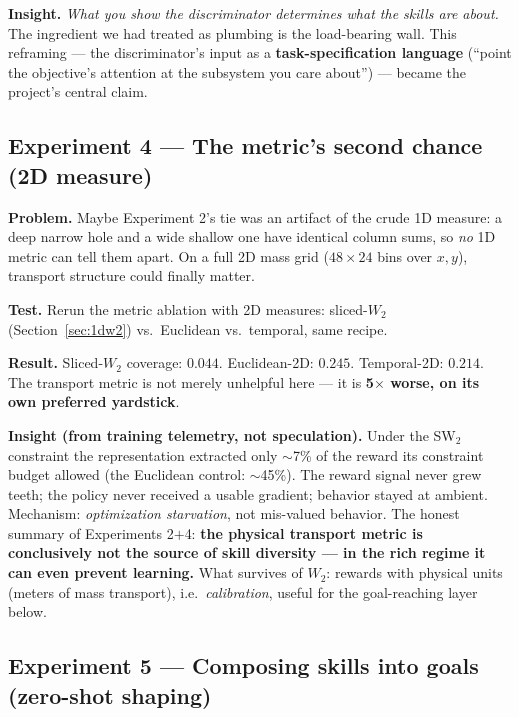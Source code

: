 \documentclass[11pt,a4paper]{article}
\begin{document}
\textbf{Insight.} \emph{What you show the discriminator determines what the
skills are about.} The ingredient we had treated as plumbing is the load-bearing
wall. This reframing --- the discriminator's input as a \textbf{task-specification
language} (``point the objective's attention at the subsystem you care about'') ---
became the project's central claim.

\subsection{Experiment 4 — The metric's second chance (2D measure)}

\textbf{Problem.} Maybe Experiment 2's tie was an artifact of the crude 1D
measure: a deep narrow hole and a wide shallow one have identical column sums,
so \emph{no} 1D metric can tell them apart. On a full 2D mass grid
($48 \times 24$ bins over $x,y$), transport structure could finally matter.

\textbf{Test.} Rerun the metric ablation with 2D measures: sliced-$W_2$
(Section~\ref{sec:1dw2}) vs.\ Euclidean vs.\ temporal, same recipe.

\textbf{Result.} Sliced-$W_2$ coverage: $0.044$. Euclidean-2D: $0.245$.
Temporal-2D: $0.214$. The transport metric is not merely unhelpful here ---
it is \textbf{5$\times$ worse, on its own preferred yardstick}.

\textbf{Insight (from training telemetry, not speculation).} Under the SW$_2$
constraint the representation extracted only $\sim$7\% of the reward its
constraint budget allowed (the Euclidean control: $\sim$45\%). The reward signal
never grew teeth; the policy never received a usable gradient; behavior stayed at
ambient. Mechanism: \emph{optimization starvation}, not mis-valued behavior. The
honest summary of Experiments 2$+$4: \textbf{the physical transport metric is
conclusively not the source of skill diversity --- in the rich regime it can even
prevent learning.} What survives of $W_2$: rewards with physical units (meters of
mass transport), i.e.\ \emph{calibration}, useful for the goal-reaching layer
below.

\subsection{Experiment 5 — Composing skills into goals (zero-shot shaping)}
\label{sec:goal}
\end{document}

